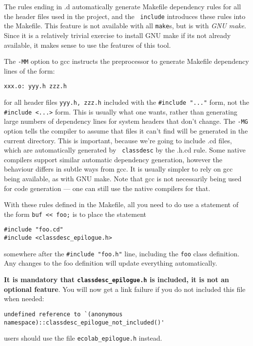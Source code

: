 The rules ending in .d automatically generate Makefile dependency
rules for all the header files used in the project, and the {\tt
  include} introduces these rules into the Makefile. This feature is
not available with all {\tt make}s, but is with {\em GNU make}. Since
it is a relatively trivial exercise to install GNU make if its not
already available, it makes sense to use the features of this tool.

The {\tt -MM} option to gcc instructs the preprocessor to generate
Makefile dependency lines of the form:
\begin{verbatim}
xxx.o: yyy.h zzz.h
\end{verbatim}
for all header files {\tt yyy.h, zzz.h} included with the
\verb+#include "..."+ form, not the \verb+#include <...>+ form. This
is usually what one wants, rather than generating large numbers of
dependency lines for system headers that don't change. The {\tt -MG}
option tells the compiler to assume that files it can't find will be
generated in the current directory. This is important, because we're
going to include .cd files, which are automatically generated by {\tt
  classdesc} by the .h.cd rule.
Some native compilers support similar automatic dependency generation,
however the behaviour differs in subtle ways from gcc. It is usually
simpler to rely on gcc being available, as with GNU make. Note that
gcc is not necessarily being used for code generation --- one can
still use the native compilers for that.

With these rules defined in the Makefile, all you need to do use a
statement of the form \verb+buf << foo;+ is to place the statement 
\begin{verbatim}
#include "foo.cd"
#include <classdesc_epilogue.h>
\end{verbatim}
somewhere after the \verb+#include "foo.h"+ line, including the
{\tt foo} class definition. Any changes to the foo definition will
update everything automatically.

{\bf It is mandatory that \verb+classdesc_epilogue.h+\label{classdesc_epilogue} is included, it is not
  an optional feature}. You will now get a link failure if you do not
included this file when needed:
\begin{verbatim}
undefined reference to `(anonymous namespace)::classdesc_epilogue_not_included()'
\end{verbatim}
\EcoLab{} users should use the file
  \verb+ecolab_epilogue.h+ instead.

\label{library-method} 

